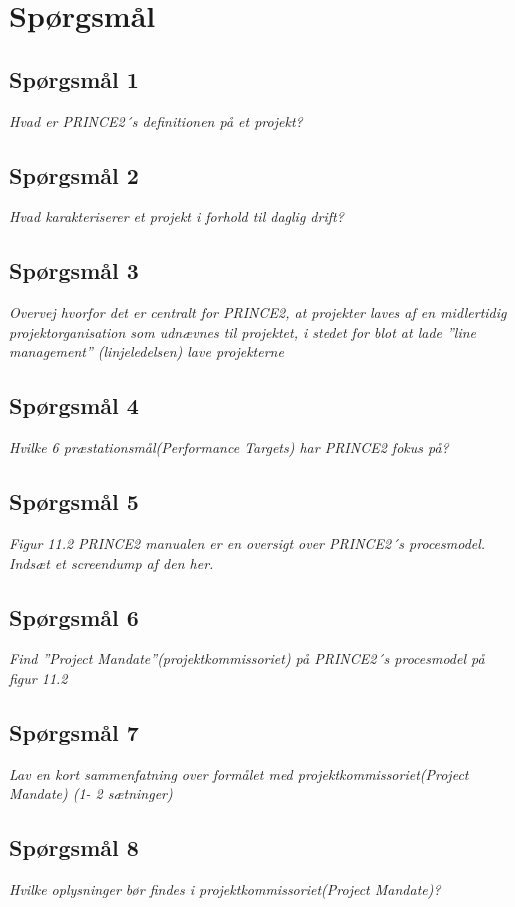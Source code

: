 \documentclass[12pt,twoside]{article}
\begin{document}
    \section{Sp\o{}rgsm\r{a}l}

    \subsection{Sp\o{}rgsm\r{a}l 1}
    \textit{Hvad er PRINCE2´s definitionen på et projekt?}
    \subsection{Sp\o{}rgsm\r{a}l 2}
    \textit{Hvad karakteriserer et projekt i forhold til daglig drift?}
    \subsection{Sp\o{}rgsm\r{a}l 3}
    \textit{Overvej hvorfor det er centralt for PRINCE2, at projekter laves af en midlertidig projektorganisation som udnævnes til projektet, i stedet for blot at lade ”line management” (linjeledelsen) lave projekterne}
    \subsection{Sp\o{}rgsm\r{a}l 4}
    \textit{Hvilke 6 præstationsmål(Performance Targets) har PRINCE2 fokus på?}
    \subsection{Sp\o{}rgsm\r{a}l 5}
    \textit{Figur 11.2 PRINCE2 manualen er en oversigt over PRINCE2´s procesmodel. Indsæt et screendump af den her.}
    \subsection{Sp\o{}rgsm\r{a}l 6}
    \textit{Find ”Project Mandate”(projektkommissoriet) på PRINCE2´s procesmodel på figur 11.2}
    \subsection{Sp\o{}rgsm\r{a}l 7}
    \textit{Lav en kort sammenfatning over formålet med projektkommissoriet(Project Mandate) (1- 2 sætninger)}
    \subsection{Sp\o{}rgsm\r{a}l 8}
    \textit{Hvilke oplysninger bør findes i projektkommissoriet(Project Mandate)?}
\end{document}
